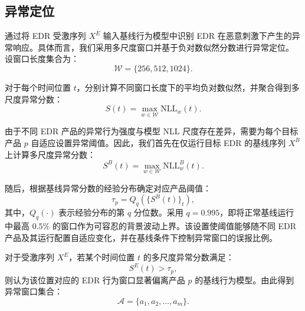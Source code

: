 ﻿\subsection{异常定位}

通过将 EDR 受激序列 \(X^{E}\) 输入基线行为模型中识别 EDR 在恶意刺激下产生的异常响应。具体而言，我们采用多尺度窗口并基于负对数似然分数进行异常定位。
设窗口长度集合为：
\begin{equation}
    \mathcal{W} = \{256, 512, 1024\}.
\end{equation}

对于每个时间位置 \(t\)，分别计算不同窗口长度下的平均负对数似然，并聚合得到多尺度异常分数：
\begin{equation}
    S(t)
    =
    \max_{w \in \mathcal{W}}
    \mathrm{NLL}_{w}(t).
\end{equation}

由于不同 EDR 产品的异常行为强度与模型 NLL 尺度存在差异，需要为每个目标产品 \(p\) 自适应设置异常阈值。因此，我们首先在仅运行目标 EDR 的基线序列 \(X^{B}\) 上计算多尺度异常分数：
\begin{equation}
    S^{B}(t)
    =
    \max_{w \in \mathcal{W}}
    \mathrm{NLL}^{B}_{w}(t).
\end{equation}

随后，根据基线异常分数的经验分布确定对应产品阈值：
\begin{equation}
    \tau_p
    =
    Q_q\left(\{S^{B}(t)\}_{t}\right),
\end{equation}
其中，\(Q_q(\cdot)\) 表示经验分布的第 \(q\) 分位数。采用 \(q=0.995\)，即将正常基线运行中最高 \(0.5\%\) 的窗口作为可容忍的背景波动上界。该设置使阈值能够随不同 EDR 产品及其运行配置自适应变化，并在基线条件下控制异常窗口的误报比例。

对于受激序列 \(X^{E}\)，若某个时间位置 \(t\) 的多尺度异常分数满足：
\begin{equation}
    S^{E}(t) > \tau_p,
\end{equation}
则认为该位置对应的 EDR 行为窗口显著偏离产品 \(p\) 的基线行为模型。由此得到异常窗口集合：
\begin{equation}
    \mathcal{A}
    =
    \{a_1, a_2, \ldots, a_m\}.
\end{equation}
